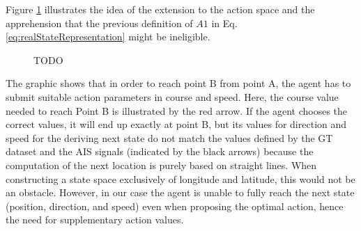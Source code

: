 Figure \ref{fig:explanation} illustrates the idea of the extension to the action space and the apprehension that the previous definition of $A1$ in Eq. \ref{eq:realStateRepresentation} might be ineligible. 
\begin{figure}[H]
    \centering
    
    \caption{TODO}
    \label{fig:explanation}
\end{figure}


The graphic shows that in order to reach point B from point A, the agent has to submit suitable action parameters in course and speed. Here, the course value needed to reach Point B is illustrated by the red arrow. If the agent chooses the correct values, it will end up exactly at point B, but its values for direction and speed for the deriving next state do not match the values defined by the GT dataset and the AIS signals (indicated by the black arrows) because the computation of the next location is purely based on straight lines. When constructing a state space exclusively of longitude and latitude, this would not be an obstacle. However, in our case the agent is unable to fully reach the next state (position, direction, and speed) even when proposing the optimal action, hence the need for supplementary action values.